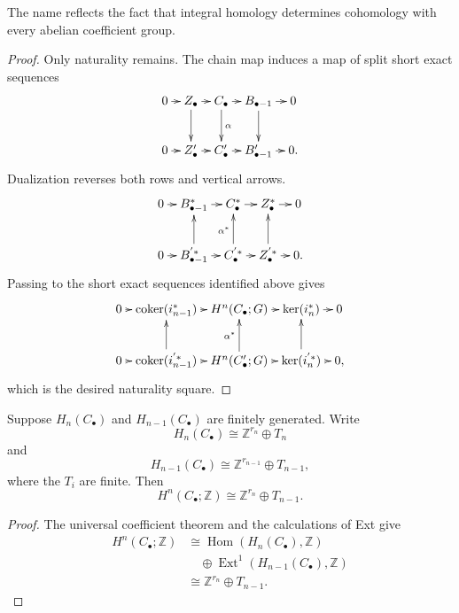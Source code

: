 \begin{remark}
\label{at-remark-name-universal}
The name reflects the fact that integral
homology determines cohomology with every
abelian coefficient group.
\end{remark}

\begin{proof}
Only naturality remains.  The chain map
induces a map of split short exact
sequences
$$
\xymatrix@C=.7em{
0 \ar[r]
  & Z_\bullet \ar[r] \ar[d]
  & C_\bullet \ar[r] \ar[d]^\alpha
  & B_{\bullet-1} \ar[r] \ar[d]
  & 0 \\
0 \ar[r]
  & Z'_\bullet \ar[r]
  & C'_\bullet \ar[r]
  & B'_{\bullet-1} \ar[r]
  & 0.
}
$$
Dualization reverses both rows and vertical
arrows.
$$
\xymatrix@C=.7em{
0 \ar[r]
  & B_{\bullet-1}^* \ar[r]
  & C_\bullet^* \ar[r]
  & Z_\bullet^* \ar[r]
  & 0 \\
0 \ar[r]
  & B_{\bullet-1}^{'*}
    \ar[r] \ar[u]
  & C_\bullet^{'*}
    \ar[r] \ar[u]^{\alpha^*}
  & Z_\bullet^{'*}
    \ar[r] \ar[u]
  & 0.
}
$$
Passing to the short exact sequences
identified above gives
$$
\xymatrix@C=.5em{
0 \ar[r]
  & \operatorname{coker}(i_{n-1}^*)
    \ar[r]
  & H^n(C_\bullet;G) \ar[r]
  & \ker(i_n^*) \ar[r]
  & 0 \\
0 \ar[r]
  & \operatorname{coker}(i_{n-1}^{'*})
    \ar[r] \ar[u]
  & H^n(C'_\bullet;G)
    \ar[r] \ar[u]^{\alpha^*}
  & \ker(i_n^{'*})
    \ar[r] \ar[u]
  & 0,
}
$$
which is the desired naturality square.
\end{proof}

\begin{corollary}
\label{at-lemma-uct-finitely-generated}
Suppose $H_n(C_\bullet)$ and
$H_{n-1}(C_\bullet)$ are finitely
generated.  Write
$$
H_n(C_\bullet)
\cong\mathbb{Z}^{r_n}\oplus T_n
$$
and
$$
H_{n-1}(C_\bullet)
\cong\mathbb{Z}^{r_{n-1}}\oplus T_{n-1},
$$
where the $T_i$ are finite.  Then
$$
H^n(C_\bullet;\mathbb{Z})
\cong\mathbb{Z}^{r_n}\oplus T_{n-1}.
$$
\end{corollary}

\begin{proof}
The universal coefficient theorem and the
calculations of Ext give
$$
\begin{aligned}
H^n(C_\bullet;\mathbb{Z})
&\cong
\operatorname{Hom}
(H_n(C_\bullet),\mathbb{Z})
\\
&\quad\oplus
\operatorname{Ext}^1
(H_{n-1}(C_\bullet),\mathbb{Z})
\\
&\cong
\mathbb{Z}^{r_n}\oplus T_{n-1}.
\end{aligned}
$$
\end{proof}

